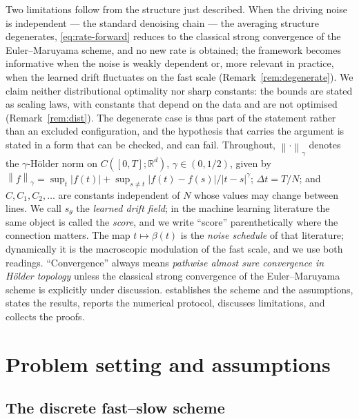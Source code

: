 \documentclass[a4paper,fleqn]{cas-dc}
\theoremstyle{definition}
\newcommand{\R}{\mathbb{R}}
\newcommand{\norm}[1]{\left\lVert#1\right\rVert}
\newcommand{\holder}[1]{\norm{#1}_{\gamma}}
\begin{document}
Two limitations follow from the structure just described. When the driving noise is
independent --- the standard denoising chain --- the averaging structure degenerates,
\eqref{eq:rate-forward} reduces to the classical strong convergence of the
Euler--Maruyama scheme, and no new rate is obtained; the framework becomes informative
when the noise is weakly dependent or, more relevant in practice, when the learned
drift fluctuates on the fast scale (Remark~\ref{rem:degenerate}). We claim neither
distributional optimality nor sharp constants: the bounds are stated as scaling laws,
with constants that depend on the data and are not optimised (Remark~\ref{rem:dist}).
The degenerate case is thus part of the statement rather than an excluded
configuration, and the hypothesis that carries the argument is stated in a form that
can be checked, and can fail. Throughout, $\holder{\cdot}$ denotes the
$\gamma$-H\"older norm on $C([0,T];\R^{d})$, $\gamma\in(0,1/2)$, given by
$\holder{f}=\sup_{t}\lvert f(t)\rvert+\sup_{s\ne t}\lvert f(t)-f(s)\rvert/\lvert t-s\rvert^{\gamma}$;
$\Delta t=T/N$; and
$C,C_{1},C_{2},\dots$ are constants independent of $N$ whose values may change between
lines. We call $s_{\theta}$ the \emph{learned drift field}; in the machine learning
literature the same object is called the \emph{score}, and we write ``score''
parenthetically where the connection matters. The map $t\mapsto\beta(t)$ is the
\emph{noise schedule} of that literature; dynamically it is the macroscopic modulation
of the fast scale, and we use both readings. ``Convergence'' always means \emph{pathwise
almost sure convergence in H\"older topology} unless the classical strong convergence
of the Euler--Maruyama scheme is explicitly under discussion.  establishes
the scheme and the assumptions,  states the results,
 reports the numerical protocol,  discusses
limitations, and  collects the proofs.
\section{Problem setting and assumptions}
\label{sec:setting}

\subsection{The discrete fast--slow scheme}
\end{document}

